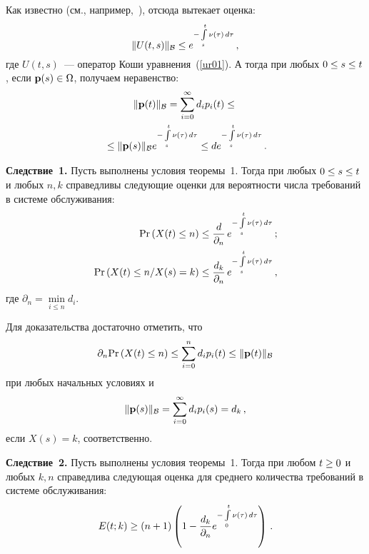 \begin{multicols}{2}
Как известно (см., например,~\cite{z08b}), отсюда вытекает оценка:
\begin{equation*}
\|U(t,s)\|_{\cal B} \le e^{-\int\limits_s^t \nu(\tau) \, d\tau} \,,
\end{equation*}
где $U(t,s)$~--- оператор Коши уравнения~(\ref{ur01}).
А тогда при любых $0 \hm\le s \hm\le t$, если $\vp(s) \hm\in \Omega$, получаем неравенство:
\begin{multline*}
\|{\bf p} (t)\|_{\cal B} = \sum\limits_{i=0}^{\infty} d_i p_i (t) \le{}\\
{}\le
\|{\bf p} (s)\|_{\cal B} e^{-\int\limits_s^t \nu(\tau) \, d\tau} \le 
{d} e^{-\int\limits_s^t \nu(\tau) \, d\tau} \,.  
\end{multline*}

\bigskip

\noindent
\textbf{Следствие~1.}
Пусть выполнены условия теоремы~1. Тогда при любых $0 \hm\le s \hm\le t$ и любых $n, k$ 
справедливы следующие оценки для вероятности числа требований в системе обслуживания:
\begin{align}
\mathrm{Pr} \left(X(t) \le n \right) &\le 
\displaystyle\frac{\displaystyle d\mathstrut}{\displaystyle \partial_n \mathstrut}\,e^{-\int\limits_s^t \nu(\tau) \, d\tau}\,;
\notag\\
\mathrm{Pr} \left(X(t)  \le n / X(s) = k \right) &\le \displaystyle\frac{\displaystyle d_k\mathstrut}{\displaystyle \partial_n\mathstrut}\,
e^{-\int\limits_s^t \nu(\tau) \, d\tau}\,,
\label{2011}
\end{align}
где ${\partial}_n = \min\limits_{i \le n} d_i$.

\medskip

Для доказательства достаточно отметить, что
\begin{equation*}
{{\partial}_n} \mathrm{Pr} \left(X(t)  \le n \right)  \le  \sum\limits_{i=0}^{n} d_i p_i (t) \le
\|{\bf p} (t)\|_{\cal B}  
\end{equation*}
при любых начальных условиях и
\begin{equation*}
\|{\bf p} (s)\|_{\cal B} = \sum\limits_{i=0}^{\infty} d_i p_i (s) = d_k\,, 
\end{equation*}
если $X(s) = k$, соответственно.

\bigskip

\noindent
\textbf{Следствие~2.}
Пусть выполнены условия теоремы~1. Тогда при любом $t \hm\ge 0$ и любых $k,n$ 
справедлива следующая оценка для среднего количества требований в системе обслуживания:
\begin{equation*}
E(t;k) \ge \left(n+1\right) \left(1 - \displaystyle\frac{\displaystyle d_k\mathstrut}{\displaystyle {\partial}_n\mathstrut}
e^{-\int\limits_0^t \nu(\tau) \, d\tau}\right)\,.  
\end{equation*}



\end{multicols}
